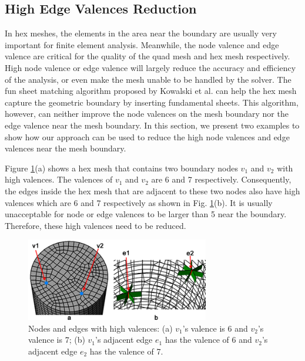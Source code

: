 \documentclass[final,5p,times,twocolumn]{elsarticle}
\begin{document}
\subsection{High Edge Valences Reduction}
\label{sec:red_edge_val}
In hex meshes, the elements in the area near the boundary are usually very important for finite element analysis\cite{Kowalski2011}. Meanwhile, the node valence and edge valence are critical for the quality of the quad mesh and hex mesh respectively\cite{Owen1998, Staten2010d,Tarini2010}. High node valence or edge valence will largely reduce the accuracy and efficiency of the analysis, or even make the mesh unable to be handled by the solver. The fun sheet matching algorithm proposed by Kowalski et al. \cite{Kowalski2011} can help the hex mesh capture the geometric boundary by inserting fundamental sheets. This algorithm, however, can neither improve the node valences on the mesh boundary nor the edge valence near the mesh boundary. In this section, we present two examples to show how our approach can be used to reduce the high node valences and edge valences near the mesh boundary.

Figure \ref{fig:exam2_input}(a) shows a hex mesh that contains two boundary nodes $v_1$ and $v_2$ with high valences. The valences of $v_1$ and $v_2$ are 6 and 7 respectively. Consequently, the edges inside the hex mesh that are adjacent to these two nodes also have high valences which are 6 and 7 respectively as shown in Fig. \ref{fig:exam2_input}(b). It is usually unacceptable for node or edge valences to be larger than 5 near the boundary. Therefore, these high valences need to be reduced.

\begin{figure}[htbp]
\begin{center}
\includegraphics[width=8cm]{exam2_input.png}
\caption{Nodes and edges with high valences: (a) $v_1$'s valence is 6 and $v_2$'s valence is 7; (b) $v_1$'s adjacent edge $e_1$ has the valence of 6 and $v_2$'s adjacent edge $e_2$ has the valence of 7.}
\label{fig:exam2_input}
\end{center}
\end{figure}
\end{document}
